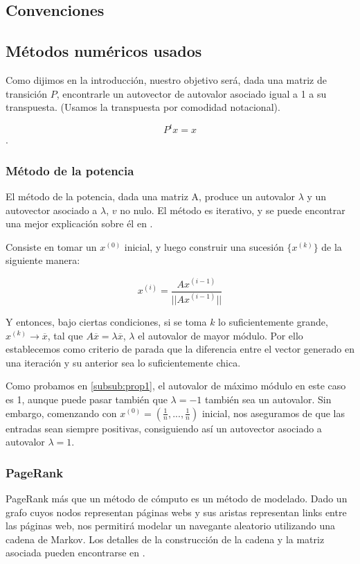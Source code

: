 \subsection{Convenciones}

\subsection{Métodos numéricos usados}

Como dijimos en la introducción, nuestro objetivo será, dada una matriz de transición $P$, encontrarle un autovector de autovalor asociado igual a 1 a su transpuesta. (Usamos la transpuesta por comodidad notacional).

\[P^t x = x\].


\subsubsection{Método de la potencia}
El método de la potencia, dada una matriz A, produce un autovalor $\lambda$ y un autovector asociado a $\lambda$, $v$ no nulo. El método es iterativo, y se puede encontrar una mejor explicación sobre él en \cite[Cap. 5.8.1]{dahlquist}. 

Consiste en tomar un $x^{(0)}$ inicial, y luego construir una sucesión $\{x^{(k)}\}$ de la siguiente manera:

\[x^{(i)} = \frac{A x^{(i-1)}}{||A x^{(i-1)}||}\]

Y entonces, bajo ciertas condiciones, si se toma $k$ lo suficientemente grande, $x^{(k)} \to \overline{x}$, tal que $A\overline{x} = \lambda \overline{x}$, $\lambda$ el autovalor de mayor módulo. Por ello establecemos como criterio de parada que la diferencia entre el vector generado en una iteración y su anterior sea lo suficientemente chica.

Como probamos en \ref{subsub:prop1}, el autovalor de máximo módulo en este caso es 1, aunque puede pasar también que $\lambda = -1$ también sea un autovalor. Sin embargo, comenzando con $x^{(0)} = (\frac1n,..., \frac1n)$ inicial, nos aseguramos de que las entradas sean siempre positivas, consiguiendo así un autovector asociado a autovalor $\lambda = 1$.

\subsubsection{PageRank}
PageRank más que un m\'etodo de cómputo es un m\'etodo de modelado. Dado un grafo cuyos nodos representan páginas webs y sus aristas representan links entre las páginas web, nos permitirá modelar un navegante aleatorio utilizando una cadena de Markov. 
Los detalles de la construcción de la cadena y la matriz asociada pueden encontrarse en \cite{Brin1998}.

